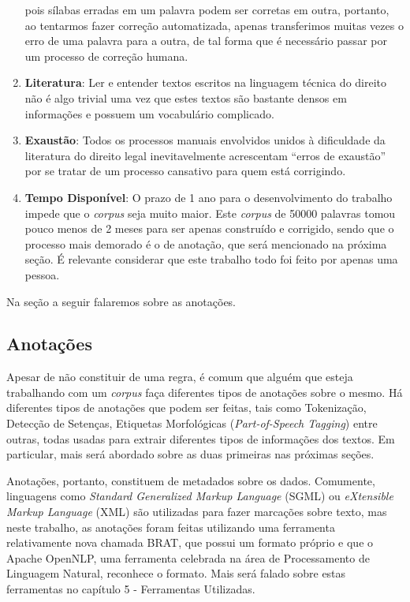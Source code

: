 \documentclass[11pt]{report}
\newcommand{\quotes}[1]{``#1''}
\begin{document}
\begin{enumerate}[label=\textbf{\arabic*.}]
  pois sílabas erradas em um palavra podem ser corretas em outra, portanto, ao tentarmos fazer correção automatizada, apenas transferimos muitas vezes o erro de uma palavra
  para a outra, de tal forma que é necessário passar por um processo de correção humana.
  \item \textbf{Literatura}: Ler e entender textos escritos na linguagem técnica do direito não é algo trivial uma vez que estes textos são bastante densos em informações e
  possuem um vocabulário complicado.
  \item \textbf{Exaustão}: Todos os processos manuais envolvidos unidos à dificuldade da literatura do direito legal inevitavelmente acrescentam \quotes{erros de exaustão}
  por se tratar de um processo cansativo para quem está corrigindo.
  \item \textbf{Tempo Disponível}: O prazo de 1 ano para o desenvolvimento do trabalho impede que o \textit{corpus} seja muito maior. Este \textit{corpus} de 50000 palavras tomou pouco menos de 2 meses
  para ser apenas construído e corrigido, sendo que o processo mais demorado é o de anotação, que será mencionado na próxima seção. É relevante considerar que este trabalho
  todo foi feito por apenas uma pessoa.
\end{enumerate}

Na seção a seguir falaremos sobre as anotações.

\subsection{Anotações}

\indent\indent Apesar de não constituir de uma regra, é comum que alguém que esteja trabalhando com um \textit{corpus} faça diferentes tipos de anotações sobre o mesmo.
Há diferentes tipos de anotações que podem ser feitas, tais como Tokenização, Detecção de Setenças, Etiquetas Morfológicas (\textit{Part-of-Speech Tagging}) entre outras, todas
usadas para extrair diferentes tipos de informações dos textos. Em particular, mais será abordado sobre as duas primeiras nas próximas seções.

Anotações, portanto, constituem de metadados sobre os dados. Comumente, linguagens como \textit{Standard Generalized Markup Language} (SGML) ou
\textit{eXtensible Markup Language} (XML) são utilizadas para fazer marcações sobre texto, mas
neste trabalho, as anotações foram feitas utilizando uma ferramenta relativamente nova chamada BRAT, que possui um
formato próprio e que o Apache OpenNLP, uma ferramenta celebrada na área de Processamento de Linguagem Natural, reconhece o formato.
Mais será falado sobre estas ferramentas no capítulo 5 - Ferramentas Utilizadas.
\end{document}
